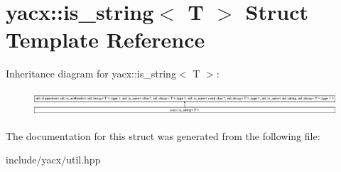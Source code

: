\hypertarget{structyacx_1_1is__string}{}\section{yacx\+:\+:is\+\_\+string$<$ T $>$ Struct Template Reference}
\label{structyacx_1_1is__string}
Inheritance diagram for yacx\+:\+:is\+\_\+string$<$ T $>$\+:\begin{figure}[H]
\begin{center}
\leavevmode
\includegraphics[height=0.929461cm]{structyacx_1_1is__string}
\end{center}
\end{figure}


The documentation for this struct was generated from the following file\+:\begin{DoxyCompactItemize}
\item 
include/yacx/util.\+hpp\end{DoxyCompactItemize}
